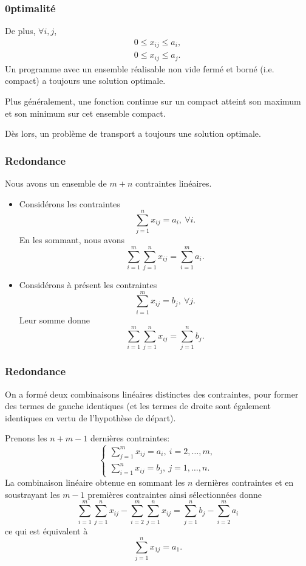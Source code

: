 \documentclass[usepdftitle=false, aspectratio=169]{beamer}
\begin{document}
\begin{frame}
\frametitle{0ptimalité}

De plus, $\forall i, j$,
\begin{align*}
0 \leq x_{ij} \leq a_i, \\
0 \leq x_{ij} \leq a_j.
\end{align*}
Un programme avec un ensemble réalisable non vide fermé et borné (i.e. compact) a toujours une solution optimale.

\mbox{}

Plus généralement, une fonction continue sur un compact atteint son maximum et son minimum sur cet ensemble compact.

\mbox{}

Dès lors, un problème de transport a toujours une solution optimale.

\end{frame}

\begin{frame}
\frametitle{Redondance}

Nous avons un ensemble de $m+n$ contraintes linéaires.
\begin{itemize}
	\item Considérons les contraintes
	$$
	\sum_{j = 1}^n x_{ij} = a_i,\ \forall i.
	$$
	En les sommant, nous avons
	$$
	\sum_{i = 1}^m \sum_{j = 1}^n x_{ij} = \sum_{i = 1}^m a_i.
	$$
	\item Considérons à présent les contraintes
	$$
	\sum_{i = 1}^m x_{ij} = b_j,\ \forall j.
	$$
	Leur somme donne
	$$
	\sum_{i = 1}^m \sum_{j = 1}^n x_{ij} = \sum_{j = 1}^n b_j.
	$$
\end{itemize}

\end{frame}

\begin{frame}
\frametitle{Redondance}

On a formé deux combinaisons linéaires distinctes des contraintes, pour former des termes de gauche identiques (et les termes de droite sont également identiques en vertu de l'hypothèse de départ).

Prenons les $n+m-1$ dernières contraintes:
$$
\begin{cases}
\sum_{j = 1}^m x_{ij} = a_i,\ i = 2,\ldots,m,\\
\sum_{i = 1}^n x_{ij} = b_j,\ j = 1,\ldots,n.
\end{cases}
$$
La combinaison linéaire obtenue en sommant les $n$ dernières contraintes et en soustrayant les $m-1$ premières contraintes ainsi sélectionnées donne
$$
\sum_{i = 1}^m \sum_{j = 1}^n x_{ij} - 
\sum_{i = 2}^m \sum_{j = 1}^n x_{ij}
= \sum_{j =1}^n b_j - \sum_{i = 2}^m a_i
$$
ce qui est équivalent à
$$
\sum_{j = 1}^n x_{1j} = a_1.
$$

\end{frame}
\end{document}
